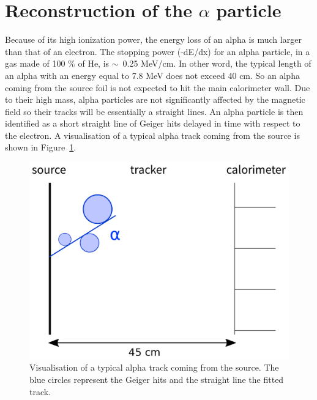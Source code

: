 \documentclass[main.tex]{subfiles}
\begin{document}


\section{Reconstruction of the $\alpha$ particle}


Because of its high ionization power, the energy loss of an alpha is much larger than that of an electron. The stopping power (-dE/dx) for an alpha particle, in a gas made of 100 \% of He, is $\sim$~0.25 MeV/cm. In other word, the typical length of an alpha with an energy equal to 7.8 MeV does not exceed 40 cm. So an alpha coming from the source foil is not expected to hit the main calorimeter wall. Due to their high mass, alpha particles are not significantly affected by the magnetic field so their tracks will be essentially a straight lines. An alpha particle is then identified as a short straight line of Geiger hits delayed in time with respect to the electron. A visualisation of a typical alpha track coming from the source is shown in Figure~\ref{visu_alpha_typical_track}.


\begin{figure}[h!]
\begin{center}
\includegraphics[scale=0.60]{pictures/Chap5/alpha_comic.pdf}
\caption{Visualisation of a typical alpha track coming from the source. The blue circles represent the Geiger hits and the straight line the fitted track.}
\label{visu_alpha_typical_track}
\end{center}
\end{figure}
\end{document}
